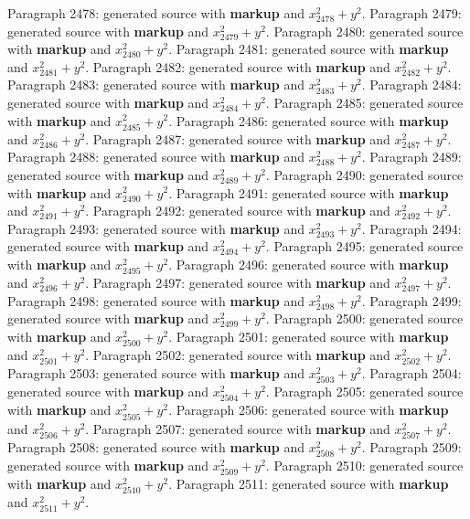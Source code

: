 \documentclass{article}
\begin{document}
Paragraph 2478: generated source with \textbf{markup} and $x_{2478}^2 + y^2$.
Paragraph 2479: generated source with \textbf{markup} and $x_{2479}^2 + y^2$.
Paragraph 2480: generated source with \textbf{markup} and $x_{2480}^2 + y^2$.
Paragraph 2481: generated source with \textbf{markup} and $x_{2481}^2 + y^2$.
Paragraph 2482: generated source with \textbf{markup} and $x_{2482}^2 + y^2$.
Paragraph 2483: generated source with \textbf{markup} and $x_{2483}^2 + y^2$.
Paragraph 2484: generated source with \textbf{markup} and $x_{2484}^2 + y^2$.
Paragraph 2485: generated source with \textbf{markup} and $x_{2485}^2 + y^2$.
Paragraph 2486: generated source with \textbf{markup} and $x_{2486}^2 + y^2$.
Paragraph 2487: generated source with \textbf{markup} and $x_{2487}^2 + y^2$.
Paragraph 2488: generated source with \textbf{markup} and $x_{2488}^2 + y^2$.
Paragraph 2489: generated source with \textbf{markup} and $x_{2489}^2 + y^2$.
Paragraph 2490: generated source with \textbf{markup} and $x_{2490}^2 + y^2$.
Paragraph 2491: generated source with \textbf{markup} and $x_{2491}^2 + y^2$.
Paragraph 2492: generated source with \textbf{markup} and $x_{2492}^2 + y^2$.
Paragraph 2493: generated source with \textbf{markup} and $x_{2493}^2 + y^2$.
Paragraph 2494: generated source with \textbf{markup} and $x_{2494}^2 + y^2$.
Paragraph 2495: generated source with \textbf{markup} and $x_{2495}^2 + y^2$.
Paragraph 2496: generated source with \textbf{markup} and $x_{2496}^2 + y^2$.
Paragraph 2497: generated source with \textbf{markup} and $x_{2497}^2 + y^2$.
Paragraph 2498: generated source with \textbf{markup} and $x_{2498}^2 + y^2$.
Paragraph 2499: generated source with \textbf{markup} and $x_{2499}^2 + y^2$.
Paragraph 2500: generated source with \textbf{markup} and $x_{2500}^2 + y^2$.
Paragraph 2501: generated source with \textbf{markup} and $x_{2501}^2 + y^2$.
Paragraph 2502: generated source with \textbf{markup} and $x_{2502}^2 + y^2$.
Paragraph 2503: generated source with \textbf{markup} and $x_{2503}^2 + y^2$.
Paragraph 2504: generated source with \textbf{markup} and $x_{2504}^2 + y^2$.
Paragraph 2505: generated source with \textbf{markup} and $x_{2505}^2 + y^2$.
Paragraph 2506: generated source with \textbf{markup} and $x_{2506}^2 + y^2$.
Paragraph 2507: generated source with \textbf{markup} and $x_{2507}^2 + y^2$.
Paragraph 2508: generated source with \textbf{markup} and $x_{2508}^2 + y^2$.
Paragraph 2509: generated source with \textbf{markup} and $x_{2509}^2 + y^2$.
Paragraph 2510: generated source with \textbf{markup} and $x_{2510}^2 + y^2$.
Paragraph 2511: generated source with \textbf{markup} and $x_{2511}^2 + y^2$.
\end{document}
